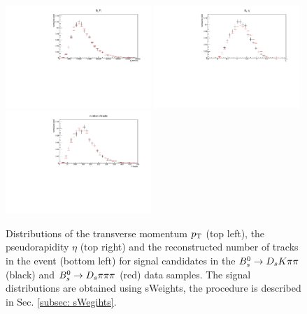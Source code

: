 \begin{figure}[h]
\includegraphics[height=7.cm,width=0.49\textwidth]{figs/Tagging/Bs_Pt_comparison.pdf}
\includegraphics[height=7.cm,width=0.49\textwidth]{figs/Tagging/Bs_eta_comparison.pdf}\\
\includegraphics[height=7.cm,width=0.49\textwidth]{figs/Tagging/nTracks_comparison.pdf}
\caption{Distributions of the transverse momentum $\mbox{$p_{\mathrm{ T}}$}$ (top left), 
the pseudorapidity $\eta$ (top right) and the reconstructed number of tracks in the event (bottom left) for signal candidates in the ${{B}^0_{s}}\rightarrow{\ensuremath{{D}_{s}}}{\ensuremath{K}}{\ensuremath{\pi}}{\ensuremath{\pi}}$ (black) and ${{B}^0_{s}}\rightarrow{\ensuremath{{D}_{s}}}{\ensuremath{\pi}}{\ensuremath{\pi}}{\ensuremath{\pi}}$ (red) data samples. 
The signal distributions are obtained using sWeights, the procedure is described in Sec. \ref{subsec: sWegihts}.}
\label{fig:kinematics_data_comparison}
\end{figure}

